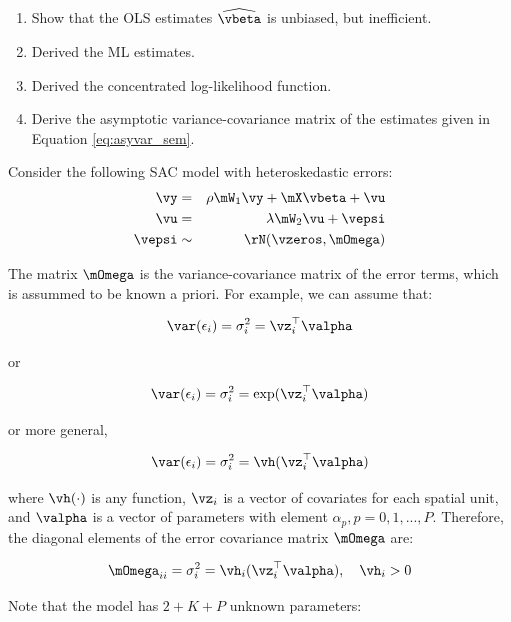 \documentclass[english,12pt]{book}\usepackage[]{graphicx}\usepackage[]{xcolor}
\begin{document}
\begin{exercises}
	\begin{enumerate}
	  \item Show that the OLS estimates $\widehat{\vbeta}$ is unbiased, but inefficient.
	  \item Derived the ML estimates.
	  \item Derived the concentrated log-likelihood function.
	  \item Derive the asymptotic variance-covariance matrix of the estimates given in Equation \eqref{eq:asyvar_sem}.
	\end{enumerate}
 
 \exercise  Consider the following SAC model with heteroskedastic errors:
 	\begin{eqnarray}
		\vy    & = & \rho \mW_1\vy + \mX\vbeta + \vu \\
		\vu & = &\lambda\mW_2\vu + \vepsi \\
		\vepsi & \sim &\rN(\vzeros, \mOmega)
	\end{eqnarray}
	
	The matrix $\mOmega$ is the variance-covariance matrix of the error terms, which is assummed to be known a priori. For example, we can assume that:
	
	\begin{equation}
		\var(\epsilon_i) = \sigma^2_i = \vz_i^\top\valpha
	\end{equation}
	
	or
	
	\begin{equation}
		\var(\epsilon_i) = \sigma^2_i = \exp(\vz_i^\top\valpha)
	\end{equation}
	
	or more general,
	
	\begin{equation}
		\var(\epsilon_i) = \sigma^2_i = \vh(\vz_i^\top\valpha)
	\end{equation}
	
	where $\vh(\cdot)$ is any function, $\vz_i$ is a vector of covariates for each spatial unit, and $\valpha$ is a vector of parameters with element $\alpha_p, p = 0, 1,..., P$.  Therefore, the diagonal elements of the error covariance  matrix $\mOmega$ are:
	
	
	\begin{equation}
		\mOmega_{ii} = \sigma^2_i = \vh_i(\vz^\top_i\valpha), \quad \vh_i > 0
	\end{equation}
	
	Note that the model has $2 + K + P$ unknown parameters:
	

\end{exercises}
\end{document}
